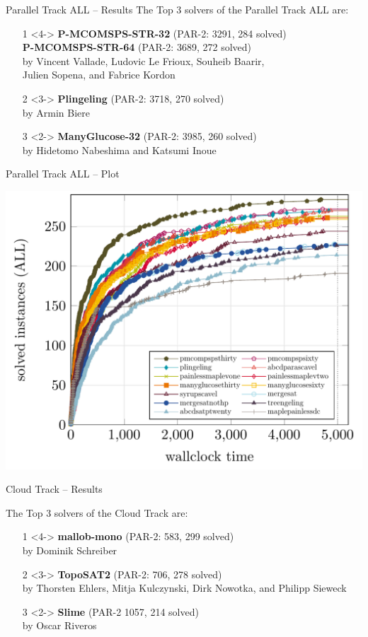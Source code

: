 \documentclass{beamer}
\begin{document}
\begin{frame}{Parallel Track ALL -- Results}
The Top 3 solvers of the Parallel Track ALL are:
\begin{itemize}
\item[1]<4-> {\bf P-MCOMSPS-STR-32} (PAR-2: 3291, 284 solved)\\
{\bf P-MCOMSPS-STR-64} (PAR-2: 3689, 272 solved)\\
by Vincent Vallade, Ludovic Le Frioux, Souheib Baarir,\\Julien Sopena, and Fabrice Kordon
\item[2]<3-> {\bf Plingeling} (PAR-2: 3718, 270 solved)\\
by Armin Biere
\item[3]<2-> {\bf ManyGlucose-32} (PAR-2: 3985, 260 solved)\\
by Hidetomo Nabeshima and Katsumi Inoue
\end{itemize}
\end{frame}

\begin{frame}{Parallel Track ALL -- Plot}

\centering
\includegraphics[width=.8\textwidth]{parallel-ALL}

\end{frame}



\begin{frame}{Cloud Track -- Results}

The Top 3 solvers of the Cloud Track are:
\begin{itemize}

\item[1]<4-> {\bf mallob-mono} (PAR-2: 583, 299 solved)\\
by Dominik Schreiber
\item[2]<3-> {\bf TopoSAT2} (PAR-2: 706, 278 solved)\\
by Thorsten Ehlers, Mitja Kulczynski, Dirk Nowotka, and Philipp Sieweck
\item[3]<2-> {\bf Slime} (PAR-2 1057, 214 solved)\\
by Oscar Riveros
\end{itemize}


\end{frame}
\end{document}
